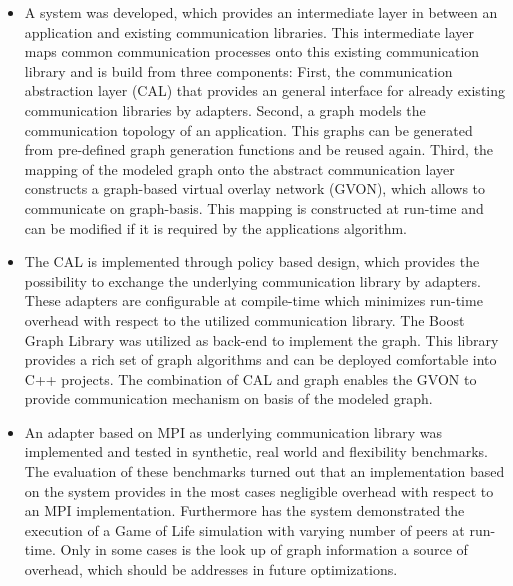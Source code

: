 \begin{itemize}

  
\item A system was developed, which provides an intermediate layer in
  between an application and existing communication libraries. This
  intermediate layer maps common communication processes onto this
  existing communication library and is build from three components:
  First, the communication abstraction layer (CAL) that provides an
  general interface for already existing communication libraries by
  adapters. Second, a graph models the communication topology of an
  application. This graphs can be generated from pre-defined graph
  generation functions and be reused again. Third, the mapping of the
  modeled graph onto the abstract communication layer constructs a
  graph-based virtual overlay network (GVON), which allows to
  communicate on graph-basis. This mapping is constructed at run-time
  and can be modified if it is required by the applications algorithm.

\item The CAL is implemented through policy based design, which
  provides the possibility to exchange the underlying communication
  library by adapters. These adapters are configurable at compile-time
  which minimizes run-time overhead with respect to the utilized
  communication library.  The Boost Graph Library was utilized as
  back-end to implement the graph. This library provides a rich set of
  graph algorithms and can be deployed comfortable into C++ projects.
  The combination of CAL and graph enables the GVON to provide
  communication mechanism on basis of the modeled graph.
  
\item An adapter based on MPI as underlying communication library was
  implemented and tested in synthetic, real world and flexibility
  benchmarks. The evaluation of these benchmarks turned out that an
  implementation based on the system provides in the most cases
  negligible overhead with respect to an MPI
  implementation. Furthermore has the system demonstrated the
  execution of a Game of Life simulation with varying number of peers
  at run-time.  Only in some cases is the look up of graph information
  a source of overhead, which should be addresses in future
  optimizations.
  

\end{itemize}
